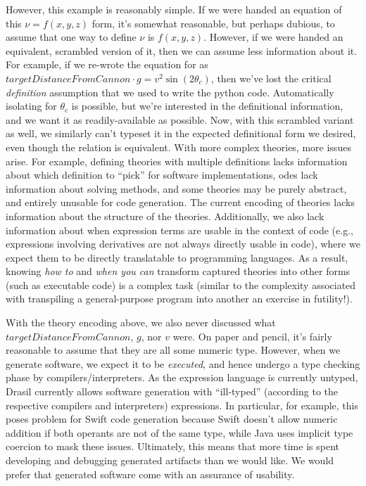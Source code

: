 However, this example is reasonably simple. If we were handed an equation of
this \(\nu{} = f(x,y,z)\) form, it's somewhat reasonable, but perhaps dubious,
to assume that one way to define \(\nu{}\) is \(f(x,y,z)\). However, if we were
handed an equivalent, scrambled version of it, then we can assume less
information about it. For example, if we re-wrote the equation for
 as \(\mathit{targetDistanceFromCannon}
\cdot{} g = v^2\sin{}(2\theta{}_c)\), then we've lost the critical
\textit{definition} assumption that we used to write the python code.
Automatically isolating for \(\theta_c\) is possible, but we're interested in
the definitional information, and we want it as readily-available as possible.
Now, with this scrambled variant as well, we similarly can't typeset it in the
expected definitional form we desired, even though the relation is equivalent.
With more complex theories, more issues arise. For example, defining theories
with multiple definitions lacks information about which definition to ``pick''
for software implementations, \acsp{ode} lack information about solving methods,
and some theories may be purely abstract, and entirely unusable for code
generation. The current encoding of theories lacks information about the
structure of the theories. Additionally, we also lack information about when
expression terms are usable in the context of code (e.g., expressions involving
derivatives are not always directly usable in code), where we expect them to be
directly translatable to programming languages. As a result, knowing \textit{how
      to} and \textit{when you can} transform captured theories into other forms (such
as executable code) is a complex task (similar to the complexity associated with
transpiling a general-purpose program into another \textemdash{} an exercise in
futility!).

With the theory encoding above, we also never discussed what
\(\mathit{targetDistanceFromCannon}\), \(g\), nor \(v\) were. On paper and
pencil, it's fairly reasonable to assume that they are all some numeric type.
However, when we generate software, we expect it to be \textit{executed}, and
hence undergo a type checking phase by compilers/interpreters. As the expression
language is currently untyped, Drasil currently allows software generation with
``ill-typed'' (according to the respective compilers and interpreters)
expressions. In particular, for example, this poses problem for Swift code
generation because Swift doesn't allow numeric addition if both operants are not
of the same type, while Java uses implicit type coercion to mask these issues.
Ultimately, this means that more time is spent developing and debugging
generated artifacts than we would like. We would prefer that generated software
come with an assurance of usability.

